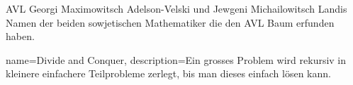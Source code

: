 {AVL}
{Georgi Maximowitsch Adelson-Velski und Jewgeni Michailowitsch Landis}
{
	Namen der beiden sowjetischen Mathematiker die den AVL Baum erfunden haben.
}

{
	name={Divide and Conquer},
	description={Ein grosses Problem wird rekursiv in kleinere einfachere Teilprobleme zerlegt, bis man dieses einfach lösen kann.}
}